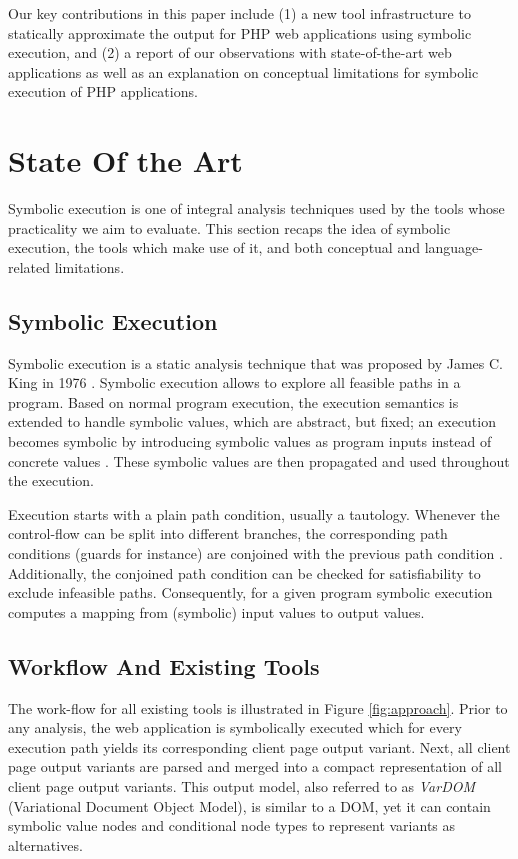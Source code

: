\documentclass[preprint]{sig-alternate-05-2015}
\begin{document}
Our key contributions in this paper include (1) a new tool infrastructure to statically approximate the output for PHP web applications using symbolic execution, and (2) a report of our observations with state-of-the-art web applications as well as an explanation on conceptual limitations for symbolic execution of PHP applications.

\section{State Of the Art}\label{sec:stateoftheart}
Symbolic execution is one of integral analysis techniques used by the tools whose practicality we aim to evaluate. This section recaps the idea of symbolic execution, the tools which make use of it, and both conceptual and language-related limitations.

\subsection{Symbolic Execution}
Symbolic execution is a static analysis technique that was proposed by James C. King in 1976 \cite{King1976}. Symbolic execution allows to explore all feasible paths in a program. Based on normal program execution, the execution semantics is extended to handle symbolic values, which are abstract, but fixed; an execution becomes symbolic by introducing symbolic values as program inputs instead of concrete values \cite{King1976,Darringer1978}. These symbolic values are then propagated and used throughout the execution. 

Execution starts with a plain path condition, usually a tautology. Whenever the control-flow can be split into different branches, the corresponding path conditions (guards for instance) are conjoined with the previous path condition \cite{King1976}. Additionally, the conjoined path condition can be checked for satisfiability to exclude infeasible paths. Consequently, for a given program symbolic execution computes a mapping from (symbolic) input values to output values. 

\subsection{Workflow And Existing Tools} \label{sec:workflow}
The work-flow for all existing tools is illustrated in Figure \ref{fig:approach}. Prior to any analysis, the web application is symbolically executed which for every execution path yields its corresponding client page output variant. Next, all client page output variants are parsed and merged into a compact representation of all client page output variants. This output model, also referred to as \emph{VarDOM} (Variational Document Object Model), is similar to a DOM, yet it can contain symbolic value nodes and conditional node types to represent variants as alternatives.
\end{document}
